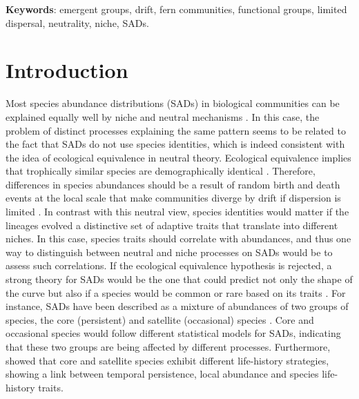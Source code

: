 \documentclass[12pt]{article}
\begin{document}


{\bf Keywords}: emergent groups, drift, fern communities, functional groups, limited dispersal, neutrality, niche, SADs.

\newpage

\section*{Introduction}

Most species abundance distributions (SADs) in biological communities can be explained equally well by niche and neutral mechanisms \citep{McGill2007}. 
In this case, the problem of distinct processes explaining the same pattern seems to be related to the fact that SADs do not use species identities, which is indeed consistent with the idea of ecological equivalence in neutral theory. Ecological equivalence implies that trophically similar species are demographically identical \citep{Hubbell2001, Hubbell2005}. Therefore, differences in species abundances should be a result of random birth and death events at the local scale that make communities diverge by drift if dispersion is limited \citep{Hubbell2001, Hubbell2005}. 
In contrast with this neutral view, species identities would matter if the lineages evolved a distinctive set of adaptive traits that translate into different niches. In this case, species traits should correlate with abundances, and thus one way to distinguish between neutral and niche processes on SADs would be to assess such correlations. 
If the ecological equivalence hypothesis is rejected, a strong theory for SADs would be the one that could predict not only the shape of the curve but also if a species would be common or rare based on its traits \citep{Mcgill2003}. 
For instance, SADs have been described as a mixture of abundances of two groups of species, the core (persistent) and satellite (occasional) species \citep{Magurran2003}. Core and occasional species would follow different statistical models for SADs, indicating that these two groups are being affected by different processes. Furthermore, \cite{Supp2015} showed that core and satellite species exhibit different life-history strategies, showing a link between temporal persistence, local abundance and species life-history traits.
\end{document}
